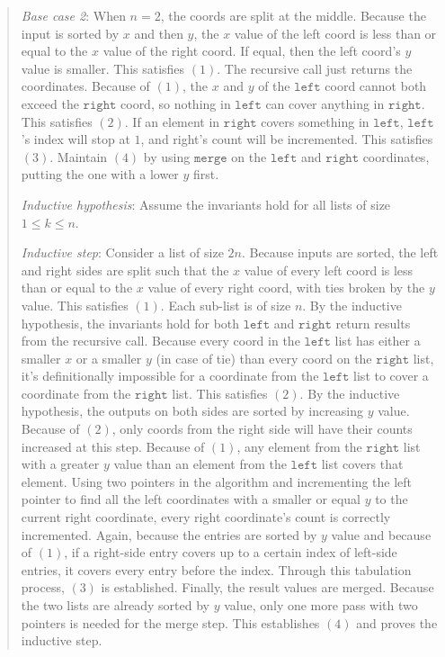 \documentclass[11pt]{article}
\newcommand{\code}[1]{$\texttt{#1}$}
\begin{document}
\begin{enumerate}
\begin{enumerate}
\begin{quote}
\medskip
\textit{Base case 2}: When $n = 2$, the coords are split at the middle. Because the input is sorted by $x$ and then $y$, the $x$ value of the left coord is less than or equal to the $x$ value of the right coord. If equal, then the left coord's $y$ value is smaller. This satisfies $(1)$. The recursive call just returns the coordinates. Because of $(1)$, the $x$ and $y$ of the \code{left} coord cannot both exceed the \code{right} coord, so nothing in \code{left} can cover anything in \code{right}. This satisfies $(2)$. If an element in \code{right} covers something in \code{left}, \code{left}'s index will stop at $1$, and right's count will be incremented. This satisfies $(3)$. Maintain $(4)$ by using \code{merge} on the \code{left} and \code{right} coordinates, putting the one with a lower $y$ first.

\medskip
\textit{Inductive hypothesis}: Assume the invariants hold for all lists of size $1 \leq k \leq n$.

\medskip
\textit{Inductive step}: Consider a list of size $2n$. Because inputs are sorted, the left and right sides are split such that the $x$ value of every left coord is less than or equal to the $x$ value of every right coord, with ties broken by the $y$ value. This satisfies $(1)$. Each sub-list is of size $n$. By the inductive hypothesis, the invariants hold for both \code{left} and \code{right} return results from the recursive call. Because every coord in the \code{left} list has either a smaller $x$ or a smaller $y$ (in case of tie) than every coord on the \code{right} list, it's definitionally impossible for a coordinate from the \code{left} list to cover a coordinate from the \code{right} list. This satisfies $(2)$. By the inductive hypothesis, the outputs on both sides are sorted by increasing $y$ value. Because of $(2)$, only coords from the right side will have their counts increased at this step. Because of $(1)$, any element from the \code{right} list with a greater $y$ value than an element from the \code{left} list covers that element. Using two pointers in the algorithm and incrementing the left pointer to find all the left coordinates with a smaller or equal $y$ to the current right coordinate, every right coordinate's count is correctly incremented. Again, because the entries are sorted by $y$ value and because of $(1)$, if a right-side entry covers up to a certain index of left-side entries, it covers every entry before the index. Through this tabulation process, $(3)$ is established. Finally, the result values are merged. Because the two lists are already sorted by $y$ value, only one more
pass with two pointers is needed for the merge step. This establishes $(4)$ and proves the inductive step.


\end{quote}
\end{enumerate}
\end{enumerate}
\end{document}
